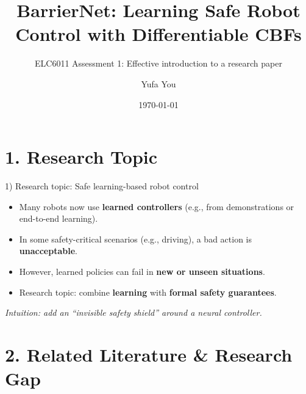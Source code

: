 \documentclass[10pt,aspectratio=169]{beamer}
\title{BarrierNet: Learning Safe Robot Control with Differentiable CBFs}
\subtitle{ELC6011 Assessment 1: Effective introduction to a research paper}
\author{Yufa You}
\institute[AAE]{Department of Aeronautical and Aviation Engineering}
\date{\today}
\begin{document}
\maketitle

\section{1. Research Topic}

\begin{frame}{1) Research topic: Safe learning-based robot control}
\begin{itemize}
  \item Many robots now use \textbf{learned controllers} (e.g., from demonstrations or end-to-end learning).
  \item In some safety-critical scenarios (e.g., driving), a bad action is \textbf{unacceptable}.
  \item However, learned policies can fail in \textbf{new or unseen situations}.
  \item Research topic: combine \textbf{learning} with \textbf{formal safety guarantees}.
\end{itemize}

\vspace{6pt}
\small
\textit{Intuition: add an ``invisible safety shield'' around a neural controller.}
\end{frame}

\section{2. Related Literature \& Research Gap}
\end{document}
